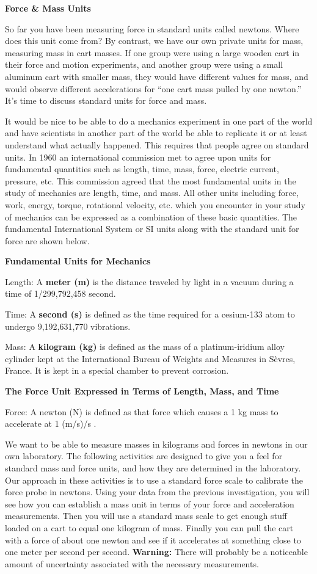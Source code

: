 \pagebreak[2]
\textbf{Force \& Mass Units} 

So far you have been measuring force in standard units called newtons. Where
does this unit come from? By contrast, we have our own private units for mass,
measuring mass in cart masses. If one group were using a large wooden cart in
their force and motion experiments, and another group were using a small aluminum
cart with smaller mass, they would have different values for mass, and would
observe different accelerations for ``one cart mass pulled by one newton.''
It's time to discuss standard units for force and mass.

It would be nice to be able to do a mechanics experiment in one part of the
world and have scientists in another part of the world be able to replicate
it or at least understand what actually happened. This requires that people
agree on standard units. In 1960 an international commission met to agree upon
units for fundamental quantities such as length, time, mass, force, electric
current, pressure, etc. This commission agreed that the most fundamental units
in the study of mechanics are length, time, and mass. All other units including
force, work, energy, torque, rotational velocity, etc. which you encounter in
your study of mechanics can be expressed as a combination of these basic quantities.
The fundamental International System or SI units along with the standard unit
for force are shown below.

\textbf{Fundamental Units for Mechanics }

Length: A \textbf{meter (m)} is the distance traveled by light in a vacuum during
a time of 1/299,792,458 second. 

Time: A \textbf{second (s)} is defined as the time required for a cesium-133
atom to undergo 9,192,631,770 vibrations. 

Mass: A \textbf{kilogram (kg)} is defined as the mass of a platinum-iridium
alloy cylinder kept at the International Bureau of Weights and Measures in S\`evres,
France. It is kept in a special chamber to prevent corrosion.

\textbf{The Force Unit Expressed in Terms of Length, Mass, and Time} 

Force: A newton (N) is defined as that force which causes a 1 kg mass to accelerate
at 1 (m/s)/s . 

We want to be able to measure masses in kilograms and forces in newtons in our
own laboratory. The following activities are designed to give you a feel for
standard mass and force units, and how they are determined in the laboratory.
Our approach in these activities is to use a standard force scale to calibrate
the force probe in newtons. Using your data from the previous investigation,
you will see how you can establish a mass unit in terms of your force and acceleration
measurements. Then you will use a standard mass scale to get enough stuff loaded
on a cart to equal one kilogram of mass. Finally you can pull the cart with
a force of about one newton and see if it accelerates at something close to
one meter per second per second. \textbf{Warning:} There will probably be a
noticeable amount of uncertainty associated with the necessary measurements.

